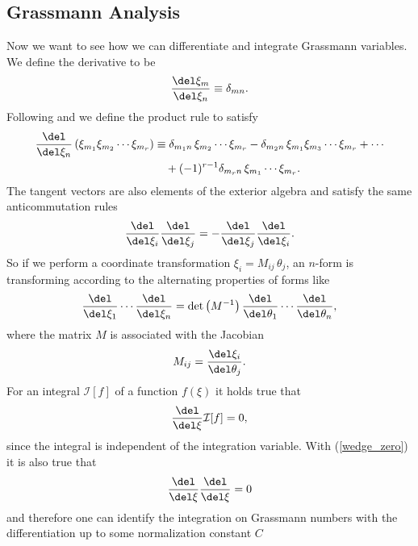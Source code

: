 \subsection{Grassmann Analysis}
Now we want to see how we can differentiate and integrate Grassmann variables. We define the derivative to be
\begin{equation}
\dfrac{\del \xi_{m}}{\del\xi_{n}}\equiv\delta_{m n} .
\end{equation}
Following \cite{Cartier:2002zp} and \cite{Berezin} we define the product rule to satisfy
\begin{align}
\dfrac{\del }{\del\xi_{n}} \left(\xi_{m_{1}}\xi_{m_{2}}\cdots \xi_{m_{r}}\right) &\equiv \delta_{m_{1} n}\,\xi_{m_{2}}\cdots\xi_{m_{r}}-\delta_{m_{2} n}\,\xi_{m_{1}} \xi_{m_{3}}\cdots \xi_{m_{r}} +\cdots  \notag \\
&\quad + (-1)^{r-1} \delta_{m_{r} n}\,\xi_{m_{1}}\cdots \xi_{m_{r}}.
\end{align}
The tangent vectors are also elements of the exterior algebra and satisfy the same anticommutation rules
\begin{equation}
\frac{\del }{\del \xi_{i}} \frac{\del }{\del\xi_{j}} = - \frac{\del }{\del \xi_{j}} \frac{\del }{\del\xi_{i}}.
\end{equation}
%
%
So if we perform a coordinate transformation $\xi_{i}=M_{ij}\,\theta_{j}$, an $n$-form is transforming according to the alternating properties of forms like
\begin{equation}
\frac{\del }{\del \xi_{1}}\cdots\frac{\del }{\del \xi_{n}} = \mathrm{det}\left(M^{-1}\right) \frac{\del }{\del \theta_{1}}\cdots \frac{\del }{\del \theta_{n}},
\label{coord_trafo}
\end{equation}
where the matrix $M$ is associated with the Jacobian
\begin{equation}
M_{ij}=\frac{\del \xi_{i}}{\del\theta_{j}}.
\end{equation}
For an integral $\mathcal{I}[f]$ of a function $f(\xi)$ it holds true that
\begin{equation}
\dfrac{\del}{\del \xi}\mathcal{I}[f] =0,
\end{equation}
since the integral is independent of the integration variable. With (\ref{wedge_zero}) it is also true that
\begin{equation}
\dfrac{\del}{\del \xi}\dfrac{\del}{\del \xi}=0
\end{equation}
and therefore one can identify the integration on Grassmann numbers with the differentiation up to some normalization constant $C$
